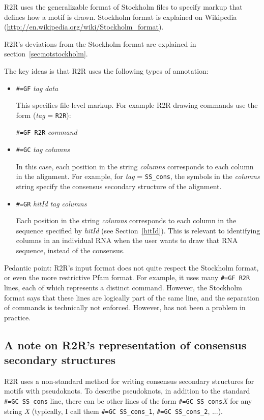 \documentclass[letterpaper,12pt]{report}
\begin{document}
R2R uses the generalizable format of Stockholm files to specify markup that defines how a motif is drawn.
Stockholm format is explained on Wikipedia (\url{http://en.wikipedia.org/wiki/Stockholm_format}).

R2R's deviations from the Stockholm format are explained in section~\ref{sec:notstockholm}.

The key ideas is that R2R uses the following types of annotation:
\begin{itemize}
\item {\tt \#=GF} {\it tag} {\it data}

This specifies file-level markup. For example R2R drawing commands use the form
({\it tag} = {\tt R2R}):

{\tt \#=GF R2R} {\it command}
\item {\tt \#=GC} {\it tag} {\it columns}

In this case, each position in the string {\it columns} corresponds to each column in the alignment.
For example, for {\it tag} = {\tt SS\_cons}, the symbols in the {\it columns} string specify the consensus
secondary structure of the alignment.
\item {\tt \#=GR} {\it hitId} {\it tag} {\it columns}

Each position in the string {\it columns} corresponds to each column in the sequence specified by {\it hitId}
(see Section~\ref{hitId}).
This is relevant to identifying columns in an individual RNA when the user wants to draw that RNA sequence, instead
of the consensus.
\end{itemize}

Pedantic point: R2R's input format does not quite respect the Stockholm format, or even the more restrictive Pfam format.  For example, it uses many {\tt \#=GF R2R} lines, each of which represents a distinct command.  However, the Stockholm format says that these lines are logically part of the same line, and the separation of commands is technically not enforced.  However, has not been a problem in practice.

\subsection{A note on R2R's representation of consensus secondary structures}

R2R uses a non-standard method for writing consensus secondary structures for motifs with pseudoknots.
To describe pseudoknots, in addition to the standard {\tt \#=GC SS\_cons} line, there can be other lines
of the form {\tt \#=GC SS\_cons}{\it X} for any string {\it X} (typically, I call them
{\tt \#=GC SS\_cons\_1}, {\tt \#=GC SS\_cons\_2}, ...).  
\end{document}
